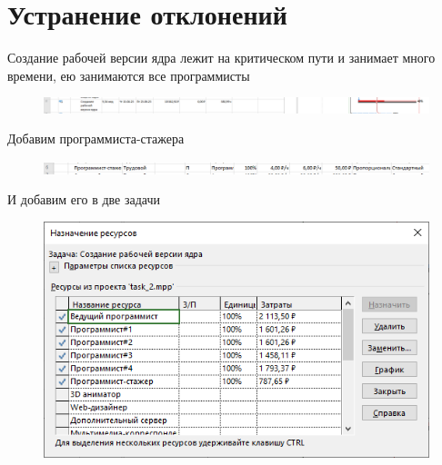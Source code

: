 \section*{Устранение отклонений}

Создание рабочей версии ядра лежит на критическом пути и занимает много времени, ею занимаются все программисты

\begin{figure}[H]
	\begin{center}
		\includegraphics[width=\textwidth]{imgs/task_1_22.png}
	\end{center}
\end{figure}

Добавим программиста-стажера

\begin{figure}[H]
	\begin{center}
		\includegraphics[width=\textwidth]{imgs/task_1_23.png}
	\end{center}
\end{figure}

И добавим его в две задачи

\begin{figure}[H]
	\begin{center}
		\includegraphics[width=\textwidth]{imgs/task_1_24.png}
	\end{center}
\end{figure}

